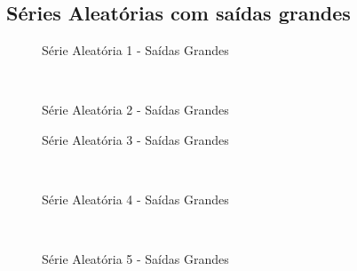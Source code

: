\documentclass[12pt]{article}
\begin{document}
\subsection{Séries Aleatórias com saídas grandes}
\clearpage
\begin{figure}
\begin{center}

\caption{Série Aleatória 1 - Saídas Grandes}
\label{1-large-random}
\end{center}
\end{figure}

\begin{figure}
\begin{center}
\\
\caption{Série Aleatória 2 - Saídas Grandes}
\label{2-large-random}
\end{center}
\end{figure}



\begin{figure}
\begin{center}

\caption{Série Aleatória 3 - Saídas Grandes}
\label{3-large-random}
\end{center}

\end{figure}

\begin{figure}
\begin{center}
 \\
\caption{Série Aleatória 4 - Saídas Grandes}
\label{4-large-random}
\end{center}
\end{figure}

\begin{figure}
\begin{center}
\\
\caption{Série Aleatória 5 - Saídas Grandes}
\label{5-large-random}
\end{center}
\end{figure}
\end{document}
